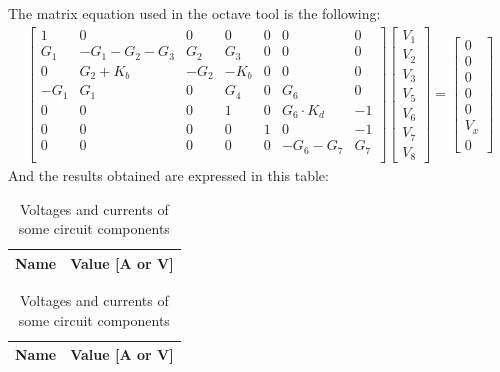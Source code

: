 The matrix equation used in the octave tool is the following:
\begin{gather}
	\begin{bmatrix}
		1 & 0 & 0 & 0 & 0 & 0 & 0 \\
		G_1 & -G_1 - G_2 - G_3 & G_2 & G_3 & 0 & 0 & 0 \\
		0 & G_2 + K_b & -G_2 & -K_b & 0 & 0 & 0 \\
		-G_1 & G_1 & 0 & G_4 & 0 & G_6 & 0 \\
		0 & 0 & 0 & 1 & 0 & G_6\cdot K_d & -1 \\
		0 & 0 & 0 & 0 & 1 & 0 & -1 \\
		0 & 0 & 0 & 0 & 0 & -G_6-G_7 & G_7 \\
	\end{bmatrix}
	\begin {bmatrix} V_1 \\ V_2 \\ V_3 \\ V_5  \\ V_6 \\ V_7 \\ V_8 \end{bmatrix}
	=
	\begin {bmatrix} 0  \\ 0  \\ 0  \\ 0 \\ 0  \\ V_x \\ 0 \end{bmatrix}
\end{gather}
And the results obtained are expressed in this table:
\begin{table}[H]
  \centering
  \begin{tabular}{|l|r|}
    \hline    
    {\bf Name} & {\bf Value [A or V]} \\ \hline
    
  \end{tabular}
  \caption{Voltages and currents of some circuit components}
  \label{tab:val21}
\end{table}

\begin{table}[H]
  \centering
  \begin{tabular}{|l|r|}
    \hline    
    {\bf Name} & {\bf Value [A or V]} \\ \hline
    
  \end{tabular}
  \caption{Voltages and currents of some circuit components}
  \label{tab:val22}
\end{table}

